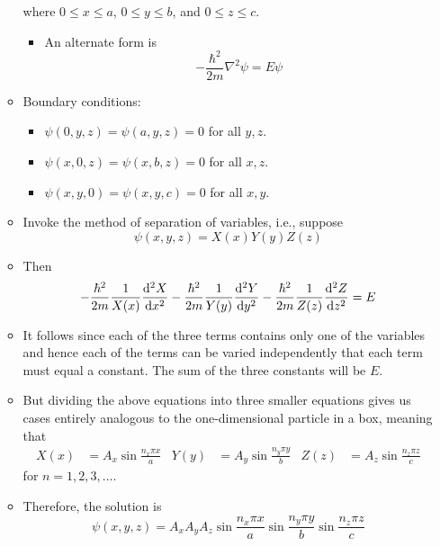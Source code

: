 \documentclass[../notes.tex]{subfiles}
\begin{document}
\begin{itemize}
\begin{itemize}
        where $0\leq x\leq a$, $0\leq y\leq b$, and $0\leq z\leq c$.
        \begin{itemize}
            \item An alternate form is
            \begin{equation*}
                -\frac{\hbar^2}{2m}\nabla^2\psi = E\psi
            \end{equation*}
        \end{itemize}
        \item Boundary conditions:
        \begin{itemize}
            \item $\psi(0,y,z)=\psi(a,y,z)=0$ for all $y,z$.
            \item $\psi(x,0,z)=\psi(x,b,z)=0$ for all $x,z$.
            \item $\psi(x,y,0)=\psi(x,y,c)=0$ for all $x,y$.
        \end{itemize}
        \item Invoke the method of separation of variables, i.e., suppose
        \begin{equation*}
            \psi(x,y,z) = X(x)Y(y)Z(z)
        \end{equation*}
        \item Then
        \begin{equation*}
            -\frac{\hbar^2}{2m}\frac{1}{X(x)}\dv[2]{X}{x}-\frac{\hbar^2}{2m}\frac{1}{Y(y)}\dv[2]{Y}{y}-\frac{\hbar^2}{2m}\frac{1}{Z(z)}\dv[2]{Z}{z} = E
        \end{equation*}
        \item It follows since each of the three terms contains only one of the variables and hence each of the terms can be varied independently that each term must equal a constant. The sum of the three constants will be $E$.
        \item But dividing the above equations into three smaller equations gives us cases entirely analogous to the one-dimensional particle in a box, meaning that
        \begin{align*}
            X(x) &= A_x\sin\frac{n_x\pi x}{a}&
            Y(y) &= A_y\sin\frac{n_y\pi y}{b}&
            Z(z) &= A_z\sin\frac{n_z\pi z}{c}
        \end{align*}
        for $n=1,2,3,\dots$.
        \item Therefore, the solution is
        \begin{equation*}
            \psi(x,y,z) = A_xA_yA_z\sin\frac{n_x\pi x}{a}\sin\frac{n_y\pi y}{b}\sin\frac{n_z\pi z}{c}

\end{equation*}
\end{itemize}
\end{itemize}
\end{document}
